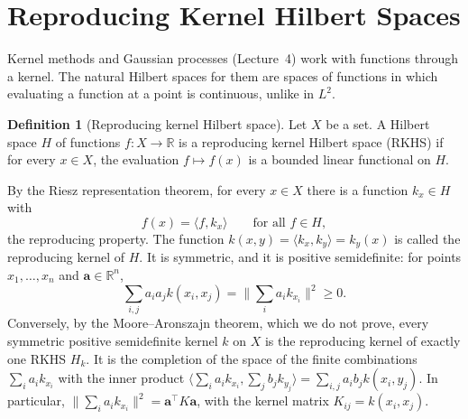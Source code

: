 \documentclass[11pt]{article}
\newcommand{\norm}[1]{\lVert #1 \rVert}
\newcommand{\ip}[2]{\langle #1, #2 \rangle}
\theoremstyle{definition}
\newtheorem{definition}{Definition}[section]
\theoremstyle{plain}
\theoremstyle{remark}
\begin{document}
\section{Reproducing Kernel Hilbert Spaces}\label{sec:rkhs}

Kernel methods and Gaussian processes (Lecture~4) work with functions through a kernel. The natural Hilbert spaces for them are spaces of functions in which evaluating a function at a point is continuous, unlike in $L^2$.

\begin{definition}[Reproducing kernel Hilbert space]\label{def:rkhs}
    Let $X$ be a set. A Hilbert space $H$ of functions $f: X \to \mathbb{R}$ is a reproducing kernel Hilbert space (RKHS) if for every $x \in X$, the evaluation $f \mapsto f(x)$ is a bounded linear functional on $H$.
\end{definition}

By the Riesz representation theorem, for every $x \in X$ there is a function $k_x \in H$ with
\[f(x) = \ip{f}{k_x} \qquad \text{for all } f \in H,\]
the reproducing property. The function $k(x, y) = \ip{k_x}{k_y} = k_y(x)$ is called the reproducing kernel of $H$. It is symmetric, and it is positive semidefinite: for points $x_1, \ldots, x_n$ and $\mathbf{a} \in \mathbb{R}^n$,
\[\sum_{i, j} a_ia_jk(x_i, x_j) = \Big\|\sum_i a_ik_{x_i}\Big\|^2 \geq 0.\]
Conversely, by the Moore--Aronszajn theorem, which we do not prove, every symmetric positive semidefinite kernel $k$ on $X$ is the reproducing kernel of exactly one RKHS $H_k$. It is the completion of the space of the finite combinations $\sum_i a_ik_{x_i}$ with the inner product $\ip{\sum_i a_ik_{x_i}}{\sum_j b_jk_{y_j}} = \sum_{i, j} a_ib_jk(x_i, y_j)$. In particular, $\norm{\sum_i a_ik_{x_i}}^2 = \mathbf{a}^\top K\mathbf{a}$, with the kernel matrix $K_{ij} = k(x_i, x_j)$.
\end{document}
